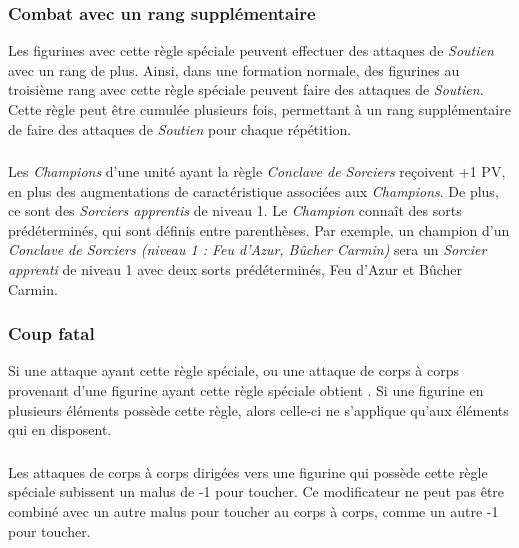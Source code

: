 \subsubsection*{Combat avec un rang supplémentaire}

Les figurines avec cette règle spéciale peuvent effectuer des attaques de \emph{Soutien} avec un rang de plus. Ainsi, dans une formation normale, des figurines au troisième rang avec cette règle spéciale peuvent faire des attaques de \emph{Soutien}. Cette règle peut être cumulée plusieurs fois, permettant à un rang supplémentaire de faire des attaques de \emph{Soutien} pour chaque répétition.

\subsubsection*{}

Les \emph{Champions} d'une unité ayant la règle \emph{Conclave de Sorciers} reçoivent +1 PV, en plus des augmentations de caractéristique associées aux \emph{Champions}. De plus, ce sont des \emph{Sorciers apprentis} de niveau 1. Le \emph{Champion} connaît des sorts prédéterminés, qui sont définis entre parenthèses. Par exemple, un champion d'un \emph{Conclave de Sorciers (niveau 1 : Feu d'Azur, Bûcher Carmin)} sera un \emph{Sorcier apprenti} de niveau 1 avec deux sorts prédéterminés, Feu d'Azur et Bûcher Carmin.

\subsubsection*{Coup fatal}

Si une attaque ayant cette règle spéciale, ou une attaque de corps à corps provenant d'une figurine ayant cette règle spéciale obtient . Si une figurine en plusieurs éléments possède cette règle, alors celle-ci ne s'applique qu'aux éléments qui en disposent.

\subsubsection*{}

Les attaques de corps à corps dirigées vers une figurine qui possède cette règle spéciale subissent un malus de -1 pour toucher. Ce modificateur ne peut pas être combiné avec un autre malus pour toucher au corps à corps, comme un autre -1 pour toucher.

